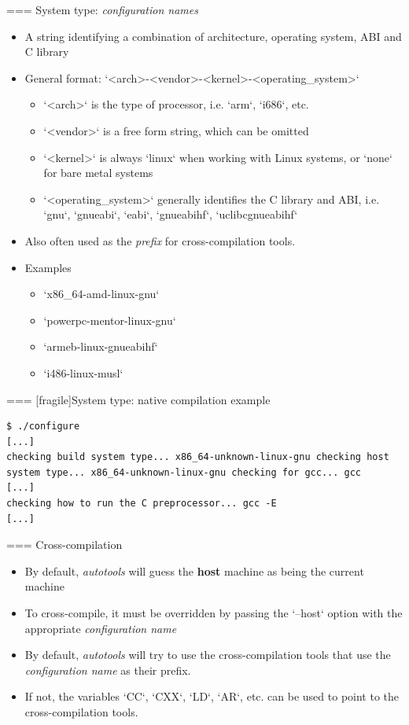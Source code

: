 === {System type: {\em configuration names}}
  \begin{itemize}
  \item A string identifying a combination of architecture, operating
    system, ABI and C library
  \item General format: `<arch>-<vendor>-<kernel>-<operating_system>`
    \begin{itemize}
    \item `<arch>` is the type of processor, i.e. `arm`,
      `i686`, etc.
    \item `<vendor>` is a free form string, which can be omitted
    \item `<kernel>` is always `linux` when working with
      Linux systems, or `none` for bare metal systems
    \item `<operating_system>` generally identifies the C library
      and ABI, i.e. `gnu`, `gnueabi`, `eabi`,
      `gnueabihf`, `uclibcgnueabihf`
    \end{itemize}
  \item Also often used as the {\em prefix} for cross-compilation
    tools.
  \item Examples
    \begin{itemize}
    \item `x86_64-amd-linux-gnu`
    \item `powerpc-mentor-linux-gnu`
    \item `armeb-linux-gnueabihf`
    \item `i486-linux-musl`
    \end{itemize}
  \end{itemize}


=== [fragile]{System type: native compilation example}

\begin{block}{}
{\small
\begin{verbatim}
$ ./configure
[...]
checking build system type... x86_64-unknown-linux-gnu checking host system type... x86_64-unknown-linux-gnu checking for gcc... gcc
[...]
checking how to run the C preprocessor... gcc -E
[...]
\end{verbatim}}
\end{block}



=== {Cross-compilation}
  \begin{itemize}
  \item By default, {\em autotools} will guess the {\bf host} machine
    as being the current machine
  \item To cross-compile, it must be overridden by passing the
    `--host` option with the appropriate {\em configuration name}
  \item By default, {\em autotools} will try to use the
    cross-compilation tools that use the {\em configuration name} as
    their prefix.
  \item If not, the variables `CC`, `CXX`, `LD`,
    `AR`, etc. can be used to point to the cross-compilation
    tools.
  \end{itemize}


